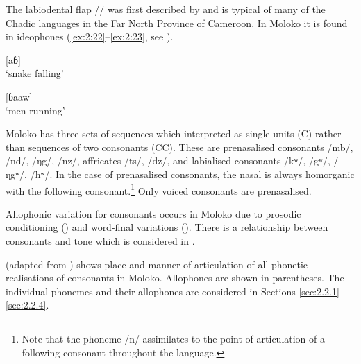 The labiodental flap /\dentalflap  / was first described by \citet{OlsonHajek2004} and is typical of many of the Chadic languages in the Far North Province of Cameroon. In Moloko it is found in ideophones (\ref{ex:2:22}--\ref{ex:2:23}, see ). 


\ea \label{ex:2:22}
\textup{[\dentalflap aɓ]}\\
\glt  ‘snake falling’
\z

\ea \label{ex:2:23}
\textup{[ɓa\dentalflap aw]}\\
\glt  ‘men running’ 
\z

Moloko has three sets of sequences which \citet{Bow1997c} interpreted as single units (C) rather than sequences of two consonants (CC).  These are prenasalised consonants /mb/, /nd/, /ŋg/, /nz/, affricates /ts/, /dz/, and labialised consonants /kʷ/, /gʷ/, /ŋgʷ/, /hʷ/. In the case of prenasalised consonants, the nasal is always homorganic with the following consonant.\footnote{Note that the phoneme /n/ assimilates to the point of articulation of a following consonant throughout the language.} Only voiced consonants are prenasalised. 

Allophonic variation for consonants occurs in Moloko due to prosodic conditioning () and word-final variations (). There is a relationship between consonants and tone which is considered in .


 (adapted from \citealt{Bow1997c}) shows place and manner of articulation of all phonetic realisations of consonants in Moloko.  Allophones are shown in parentheses. The individual phonemes and their allophones are considered in Sections \ref{sec:2.2.1}--\ref{sec:2.2.4}.

